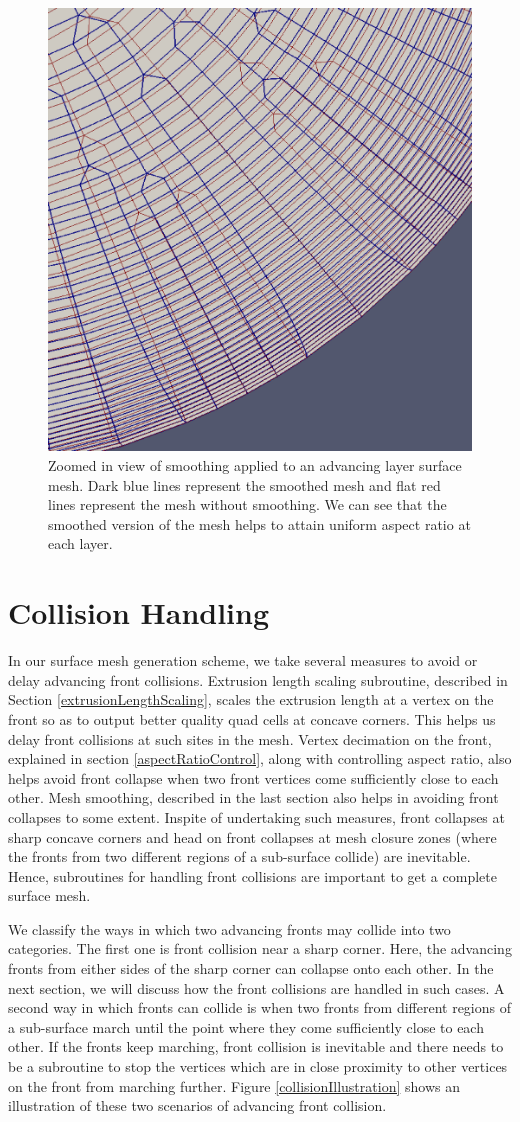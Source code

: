 \begin{figure}
\centering
\includegraphics[width=0.4\linewidth]{img/m2/smoothing/smoothing-comparison-cylinder-cap.eps}
\caption{Zoomed in view of smoothing applied to an advancing layer surface mesh. Dark blue lines represent the smoothed mesh and flat red lines represent the mesh without smoothing. We can see that the smoothed version of the mesh helps to attain uniform aspect ratio at each layer.}
\label{fig-smoothing-cylinder}
\end{figure}

\section{Collision Handling}

In our surface mesh generation scheme, we take several measures to avoid or delay advancing front collisions. Extrusion length scaling subroutine, described in Section \ref{extrusionLengthScaling}, scales the extrusion length at a vertex on the front so as to output better quality quad cells at concave corners. This helps us delay front collisions at such sites in the mesh. Vertex decimation on the front, explained in section \ref{aspectRatioControl}, along with controlling aspect ratio, also helps avoid front collapse when two front vertices come sufficiently close to each other. Mesh smoothing, described in the last section also helps in avoiding front collapses to some extent. Inspite of undertaking such measures, front collapses at sharp concave corners and head on front collapses at mesh closure zones (where the fronts from two different regions of a sub-surface collide) are inevitable. Hence, subroutines for handling front collisions are important to get a complete surface mesh.

We classify the ways in which two advancing fronts may collide into two categories. The first one is front collision near a sharp corner. Here, the advancing fronts from either sides of the sharp corner can collapse onto each other. In the next section, we will discuss how the front collisions are handled in such cases. A second way in which fronts can collide is when two fronts from different regions of a sub-surface march until the point where they come sufficiently close to each other. If the fronts keep marching, front collision is inevitable and there needs to be a subroutine to stop the vertices which are in close proximity to other vertices on the front from marching further. Figure \ref{collisionIllustration} shows an illustration of these two scenarios of advancing front collision.

